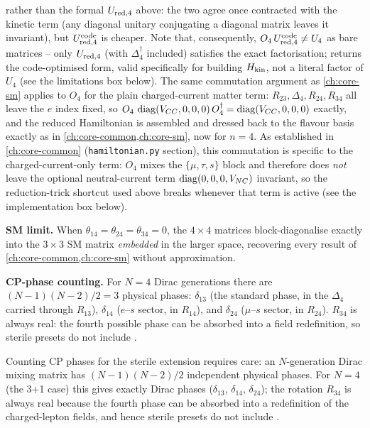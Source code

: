 \begin{theorybox}
rather than the formal $U_{\rm red,4}$ above: the two agree once contracted
with the kinetic term (any diagonal unitary conjugating a diagonal matrix
leaves it invariant), but $U_{\rm red,4}^{\rm code}$ is cheaper. Note that,
consequently, $O_4\,U_{\rm red,4}^{\rm code}\neq U_4$ as bare matrices --
only $U_{\rm red,4}$ (with $\Delta_4^\dagger$ included) satisfies the exact
factorisation;  returns the code-optimised
form, valid specifically for building $H_{\rm kin}$, not a literal factor
of $U_4$ (see the limitations box below). The same commutation argument as
\cref{ch:core-sm} applies to $O_4$ for the plain charged-current matter
term: $R_{23},\Delta_4,R_{24},R_{34}$ all leave the $e$ index fixed, so
$O_4\,\operatorname{diag}(V_{CC},0,0,0)\,O_4^\dagger=\operatorname{diag}(V_{CC},0,0,0)$ exactly, and the
reduced Hamiltonian is assembled and dressed back to the flavour basis
exactly as in \cref{ch:core-common,ch:core-sm}, now for $n=4$. As
established in \cref{ch:core-common} (\texttt{hamiltonian.py} section),
this commutation is specific to the charged-current-only term: $O_4$ mixes
the $\{\mu,\tau,s\}$ block and therefore does \emph{not} leave the optional
neutral-current term $\operatorname{diag}(0,0,0,V_{NC})$ invariant, so the reduction-trick
shortcut used above breaks whenever that term is active (see the
implementation box below).

\textbf{SM limit.} When $\theta_{14}=\theta_{24}=\theta_{34}=0$, the
$4\times4$ matrices block-diagonalise exactly into the $3\times3$ SM matrix
\emph{embedded} in the larger space, recovering every result of
\cref{ch:core-common,ch:core-sm} without approximation.

\textbf{CP-phase counting.} For $N=4$ Dirac generations there are
$(N-1)(N-2)/2=3$ physical phases: $\delta_{13}$ (the standard phase, in the
$\Delta_4$ carried through $R_{13}$), $\delta_{14}$ ($e$--$s$ sector, in
$R_{14}$), and $\delta_{24}$ ($\mu$--$s$ sector, in $R_{24}$). $R_{34}$ is
always real: the fourth possible phase can be absorbed into a field
redefinition, so sterile presets do not include .
\end{theorybox}

\begin{notebox}
Counting CP phases for the sterile extension requires care: an
$N$-generation Dirac mixing matrix has $(N-1)(N-2)/2$ independent physical
phases. For $N=4$ (the 3+1 case) this gives exactly  Dirac
phases ($\delta_{13}$, $\delta_{14}$, $\delta_{24}$); the rotation
$R_{34}$ is always real because the fourth phase can be absorbed into a
redefinition of the charged-lepton fields, and hence sterile presets do not
include .
\end{notebox}

